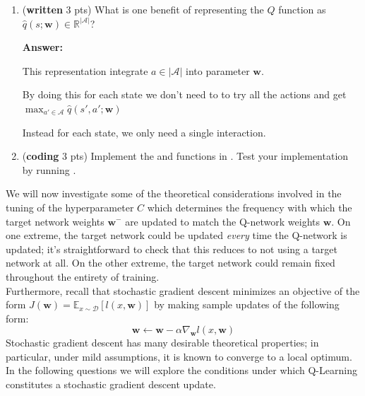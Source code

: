 \documentclass{article}
\begin{document}
\begin{enumerate}

\item (\textbf{written} 3 pts) What is one benefit of representing the $Q$ function as $\hat{q}(s; \mathbf{w}) \in \mathbb{R}^{|\mathcal{A}|}$?

\textbf{Answer:}

This representation integrate $a \in |\mathcal{A}|$ into parameter $\mathbf{w}$.

By doing this for each state we don't need to to try all the actions and get $\max_{a' \in \mathcal{A}}\hat{q}\left(s', a'; \mathbf{w} \right)$

Instead for each state, we only need a single interaction.


\item (\textbf{coding} 3 pts) Implement the  and  functions in . Test your implementation by running .
\end{enumerate}

We will now investigate some of the theoretical considerations involved in the tuning of the hyperparameter $C$ which determines the frequency with which the target network weights $\mathbf{w^-}$ are updated to match the Q-network weights $\mathbf{w}$. On one extreme, the target network could be updated \textit{every} time the Q-network is updated; it's straightforward to check that this reduces to not using a target network at all. On the other extreme, the target network could remain fixed throughout the entirety of training.\\

Furthermore, recall that stochastic gradient descent minimizes an objective of the form $J(\mathbf{w}) = \mathbb{E}_{x \sim \mathcal{D}}[l(x,\mathbf{w})]$ by making sample updates of the following form:
\[
\mathbf{w} \leftarrow \mathbf{w} - \alpha \nabla_{\mathbf{w}}l(x,\mathbf{w})
\]
Stochastic gradient descent has many desirable theoretical properties; in particular, under mild assumptions, it is known to converge to a local optimum. In the following questions we will explore the conditions under which Q-Learning constitutes a stochastic gradient descent update.
\end{document}

